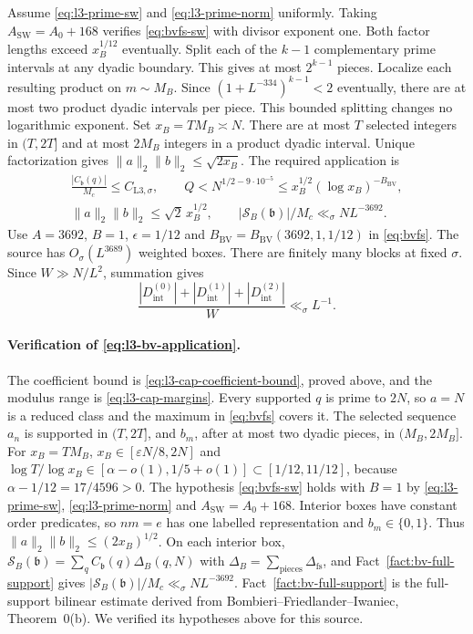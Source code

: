 Assume \eqref{eq:l3-prime-sw} and \eqref{eq:l3-prime-norm} uniformly.
Taking $A_{\mathrm{SW}}=A_0+168$ verifies
\eqref{eq:bvfs-sw} with divisor exponent one.
Both factor lengths exceed $x_B^{1/12}$ eventually.
Split each of the $k-1$ complementary prime intervals at any dyadic
boundary. This gives at most $2^{k-1}$ pieces. Localize each resulting
product on $m\sim M_B$. Since $(1+L^{-334})^{k-1}<2$ eventually,
there are at most two product dyadic intervals per piece.
This bounded splitting changes no logarithmic exponent.
Set $x_B=TM_B\asymp N$.
There are at most $T$ selected integers in $(T,2T]$ and at most
$2M_B$ integers in a product dyadic interval. Unique factorization gives
$\|a\|_2\|b\|_2\le\sqrt{2x_B}$.
The required application is
\begin{equation}\label{eq:l3-bv-application}
\begin{gathered}
 \frac{|C_{\mathfrak b}(q)|}{M_c}\le C_{\mathrm{L3},\sigma},\qquad
 Q<N^{1/2-9\cdot10^{-5}}\le x_B^{1/2}(\log x_B)^{-B_{\mathrm{BV}}},\\
 \|a\|_2\|b\|_2\le\sqrt{2}\,x_B^{1/2},\qquad
 |\mathcal S_B(\mathfrak b)|/M_c\ll_\sigma NL^{-3692}.
\end{gathered}
\end{equation}
Use $A=3692$, $B=1$, $\epsilon=1/12$ and
$B_{\mathrm{BV}}=B_{\mathrm{BV}}(3692,1,1/12)$ in \eqref{eq:bvfs}.
The source has $O_\sigma(L^{3689})$ weighted boxes.
There are finitely many blocks at fixed $\sigma$.
Since $W\gg N/L^2$, summation gives
\begin{equation}\label{eq:l3-bv-total}
 \frac{|D_{\mathrm{int}}^{(0)}|+|D_{\mathrm{int}}^{(1)}|
          +|D_{\mathrm{int}}^{(2)}|}{W}\ll_\sigma L^{-1}.
\end{equation}
\paragraph{Verification of \eqref{eq:l3-bv-application}.}
The coefficient bound is \eqref{eq:l3-cap-coefficient-bound}, proved above,
and the modulus range is \eqref{eq:l3-cap-margins}. Every supported $q$ is
prime to $2N$, so $a=N$ is a reduced class and the maximum in
\eqref{eq:bvfs} covers it. The selected sequence $a_n$ is supported in
$(T,2T]$, and $b_m$, after at most two dyadic pieces, in $(M_B,2M_B]$.
For $x_B=TM_B$, $x_B\in[\varepsilon N/8,2N]$ and
$\log T/\log x_B\in[\alpha-o(1),1/5+o(1)]\subset[1/12,11/12]$, because
$\alpha-1/12=17/4596>0$. The hypothesis \eqref{eq:bvfs-sw} holds with
$B=1$ by \eqref{eq:l3-prime-sw}, \eqref{eq:l3-prime-norm} and
$A_{\mathrm{SW}}=A_0+168$. Interior boxes have constant order predicates,
so $nm=e$ has one labelled representation and $b_m\in\{0,1\}$. Thus
$\|a\|_2\|b\|_2\le(2x_B)^{1/2}$. On each interior box,
$\mathcal S_B(\mathfrak b)=\sum_qC_{\mathfrak b}(q)\Delta_B(q,N)$ with
$\Delta_B=\sum_{\mathrm{pieces}}\Delta_{\mathrm{fs}}$, and
Fact~\ref{fact:bv-full-support} gives
$|\mathcal S_B(\mathfrak b)|/M_c\ll_\sigma NL^{-3692}$.
Fact~\ref{fact:bv-full-support} is the full-support bilinear estimate
derived from Bombieri--Friedlander--Iwaniec, Theorem~0(b). We verified its hypotheses
above for this source.

